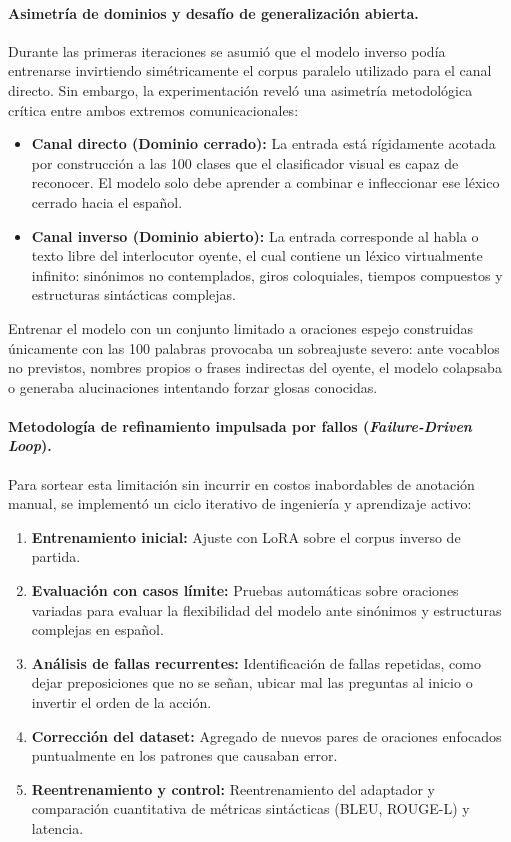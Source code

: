 \paragraph{Asimetría de dominios y desafío de generalización abierta.}
Durante las primeras iteraciones se asumió que el modelo inverso podía entrenarse invirtiendo simétricamente el corpus paralelo utilizado para el canal directo. Sin embargo, la experimentación reveló una asimetría metodológica crítica entre ambos extremos comunicacionales:
\begin{itemize}
    \item \textbf{Canal directo (Dominio cerrado):} La entrada está rígidamente acotada por construcción a las 100 clases que el clasificador visual es capaz de reconocer. El modelo solo debe aprender a combinar e infleccionar ese léxico cerrado hacia el español.
    \item \textbf{Canal inverso (Dominio abierto):} La entrada corresponde al habla o texto libre del interlocutor oyente, el cual contiene un léxico virtualmente infinito: sinónimos no contemplados, giros coloquiales, tiempos compuestos y estructuras sintácticas complejas.
\end{itemize}
Entrenar el modelo con un conjunto limitado a oraciones espejo construidas únicamente con las 100 palabras provocaba un sobreajuste severo: ante vocablos no previstos, nombres propios o frases indirectas del oyente, el modelo colapsaba o generaba alucinaciones intentando forzar glosas conocidas.

\paragraph{Metodología de refinamiento impulsada por fallos (\textit{Failure-Driven Loop}).}
Para sortear esta limitación sin incurrir en costos inabordables de anotación manual, se implementó un ciclo iterativo de ingeniería y aprendizaje activo:
\begin{enumerate}
    \item \textbf{Entrenamiento inicial:} Ajuste con LoRA sobre el corpus inverso de partida.
    \item \textbf{Evaluación con casos límite:} Pruebas automáticas sobre oraciones variadas para evaluar la flexibilidad del modelo ante sinónimos y estructuras complejas en español.
    \item \textbf{Análisis de fallas recurrentes:} Identificación de fallas repetidas, como dejar preposiciones que no se señan, ubicar mal las preguntas al inicio o invertir el orden de la acción.
    \item \textbf{Corrección del dataset:} Agregado de nuevos pares de oraciones enfocados puntualmente en los patrones que causaban error.
    \item \textbf{Reentrenamiento y control:} Reentrenamiento del adaptador y comparación cuantitativa de métricas sintácticas (BLEU, ROUGE-L) y latencia.
\end{enumerate}

